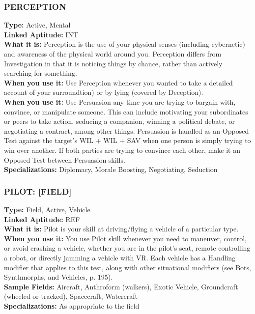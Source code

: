\subsubsection{PERCEPTION}
\textbf{Type:} Active, Mental
\\ \textbf{Linked Aptitude:} INT
\\ \textbf{What it is:} Perception is the use of your physical
senses (including cybernetic) and awareness of the
physical world around you. Perception differs from
Investigation in that it is noticing things by chance,
rather than actively searching for something.
\\ \textbf{When you use it:} Use Perception whenever you
wanted to take a detailed account of your surroundtion) or by lying (covered by Deception).
\\ \textbf{When you use it:} Use Persuasion any time you are
trying to bargain with, convince, or manipulate someone. This can include motivating your subordinates or
peers to take action, seducing a companion, winning
a political debate, or negotiating a contract, among
other things. Persuasion is handled as an Opposed
Test against the target’s WIL + WIL + SAV when one
person is simply trying to win over another. If both
parties are trying to convince each other, make it an
Opposed Test between Persuasion skills.
\\ \textbf{Specializations:} Diplomacy, Morale Boosting, Negotiating, Seduction

\subsubsection{PILOT: [FIELD]}
\textbf{Type:} Field, Active, Vehicle
\\ \textbf{Linked Aptitude:} REF
\\ \textbf{What it is:} Pilot is your skill at driving/flying a vehicle of a particular type.
\\ \textbf{When you use it:} You use Pilot skill whenever you
need to maneuver, control, or avoid crashing a vehicle,
whether you are in the pilot’s seat, remote controlling
a robot, or directly jamming a vehicle with VR. Each
vehicle has a Handling modifier that applies to this
test, along with other situational modifiers (see Bots,
Synthmorphs, and Vehicles, p. 195).
\\ \textbf{Sample Fields:} Aircraft, Anthroform (walkers), Exotic
Vehicle, Groundcraft (wheeled or tracked), Spacecraft, Watercraft
\\ \textbf{Specializations:} As appropriate to the field

